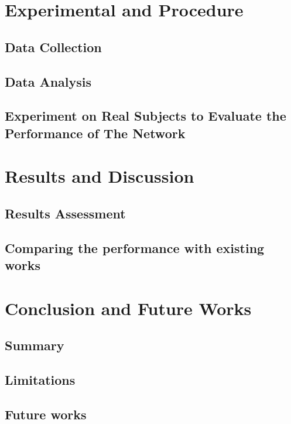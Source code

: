 \documentclass[letterpaper,12pt,titlepage,oneside,final]{book}
\begin{document}
\chapter{Experimental and Procedure}

\section{Data Collection}

\section{Data Analysis}

\section{Experiment on Real Subjects to Evaluate the Performance of The Network}

\chapter{Results and Discussion}

\section{Results Assessment}

\section{Comparing the performance with existing works}

\chapter{Conclusion and Future Works}

\section{Summary}

\section{Limitations}

\section{Future works}
\end{document}
